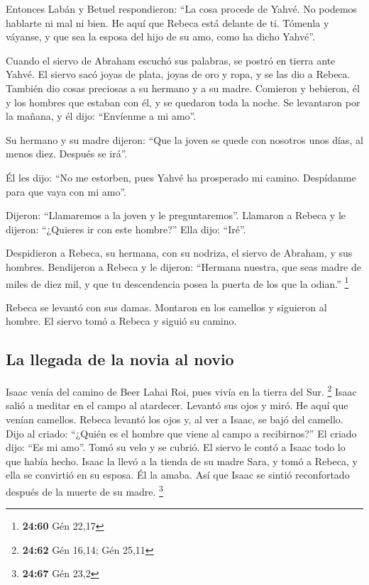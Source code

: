  Entonces Labán y Betuel respondieron: ``La cosa procede
de Yahvé. No podemos hablarte ni mal ni bien.  He aquí
que Rebeca está delante de ti. Tómenla y váyanse, y que sea la esposa
del hijo de su amo, como ha dicho Yahvé''.

 Cuando el siervo de Abraham escuchó sus palabras, se
postró en tierra ante Yahvé.  El siervo sacó joyas de
plata, joyas de oro y ropa, y se las dio a Rebeca. También dio cosas
preciosas a su hermano y a su madre.  Comieron y
bebieron, él y los hombres que estaban con él, y se quedaron toda la
noche. Se levantaron por la mañana, y él dijo: ``Envíenme a mi amo''.

 Su hermano y su madre dijeron: ``Que la joven se quede
con nosotros unos días, al menos diez. Después se irá''.

 Él les dijo: ``No me estorben, pues Yahvé ha prosperado
mi camino. Despídanme para que vaya con mi amo''.

 Dijeron: ``Llamaremos a la joven y le preguntaremos''.
 Llamaron a Rebeca y le dijeron: ``¿Quieres ir con este
hombre?'' Ella dijo: ``Iré''.

 Despidieron a Rebeca, su hermana, con su nodriza, el
siervo de Abraham, y sus hombres.  Bendijeron a Rebeca y
le dijeron: ``Hermana nuestra, que seas madre de miles de diez mil, y
que tu descendencia posea la puerta de los que la odian.'' \footnote{\textbf{24:60}
  Gén 22,17}

 Rebeca se levantó con sus damas. Montaron en los
camellos y siguieron al hombre. El siervo tomó a Rebeca y siguió su
camino.

\hypertarget{la-llegada-de-la-novia-al-novio}{%
\subsection{La llegada de la novia al
novio}\label{la-llegada-de-la-novia-al-novio}}

 Isaac venía del camino de Beer Lahai Roi, pues vivía en
la tierra del Sur. \footnote{\textbf{24:62} Gén 16,14; Gén 25,11}
 Isaac salió a meditar en el campo al atardecer. Levantó
sus ojos y miró. He aquí que venían camellos.  Rebeca
levantó los ojos y, al ver a Isaac, se bajó del camello. 
Dijo al criado: ``¿Quién es el hombre que viene al campo a recibirnos?''
El criado dijo: ``Es mi amo''. Tomó su velo y se cubrió. 
El siervo le contó a Isaac todo lo que había hecho. 
Isaac la llevó a la tienda de su madre Sara, y tomó a Rebeca, y ella se
convirtió en su esposa. Él la amaba. Así que Isaac se sintió
reconfortado después de la muerte de su madre. \footnote{\textbf{24:67}
  Gén 23,2}

